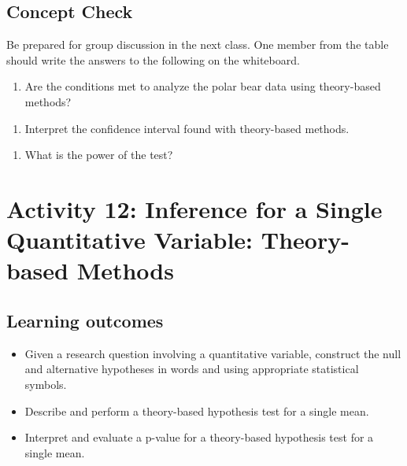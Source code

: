 \documentclass[
]{report}
\providecommand{\tightlist}{%
  \setlength{\itemsep}{0pt}\setlength{\parskip}{0pt}}
\begin{document}

\subsection{Concept Check}\label{concept-check-5}

Be prepared for group discussion in the next class. One member from the table should write the answers to the following on the whiteboard.

\begin{enumerate}
\def\labelenumi{\arabic{enumi}.}
\tightlist
\item
  Are the conditions met to analyze the polar bear data using theory-based methods?
\end{enumerate}

\vspace{0.7in}

\begin{enumerate}
\def\labelenumi{\arabic{enumi}.}
\setcounter{enumi}{1}
\tightlist
\item
  Interpret the confidence interval found with theory-based methods.
\end{enumerate}

\vspace{0.2in}

\begin{enumerate}
\def\labelenumi{\arabic{enumi}.}
\setcounter{enumi}{2}
\tightlist
\item
  What is the power of the test?
\end{enumerate}

\vspace{0.6in}

\newpage

\section{Activity 12: Inference for a Single Quantitative Variable: Theory-based Methods}\label{activity-12-inference-for-a-single-quantitative-variable-theory-based-methods}


\subsection{Learning outcomes}\label{learning-outcomes-12}

\begin{itemize}
\item
  Given a research question involving a quantitative variable, construct the null and alternative hypotheses
  in words and using appropriate statistical symbols.
\item
  Describe and perform a theory-based hypothesis test for a single mean.
\item
  Interpret and evaluate a p-value for a theory-based hypothesis test for a single mean.
\end{itemize}
\end{document}
